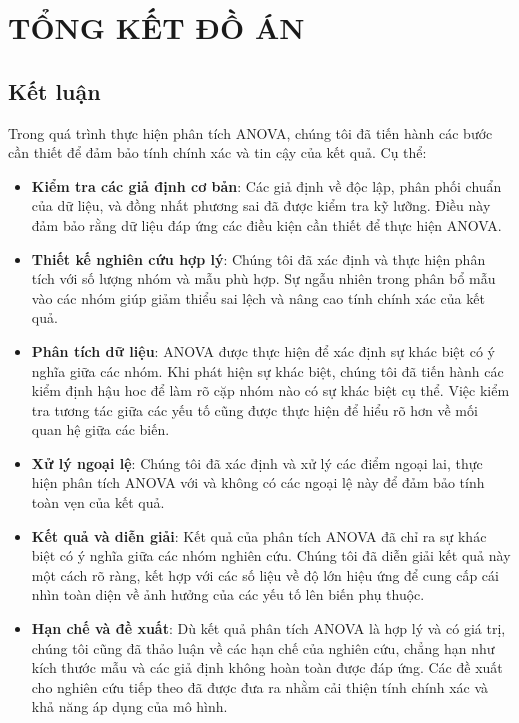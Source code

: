 \chapter{TỔNG KẾT ĐỒ ÁN}


\section{Kết luận}

Trong quá trình thực hiện phân tích ANOVA, chúng tôi đã tiến hành các bước cần thiết để đảm bảo tính chính xác và tin cậy của kết quả. Cụ thể:

\begin{itemize}
    \item \textbf{Kiểm tra các giả định cơ bản}: Các giả định về độc lập, phân phối chuẩn của dữ liệu, và đồng nhất phương sai đã được kiểm tra kỹ lưỡng. Điều này đảm bảo rằng dữ liệu đáp ứng các điều kiện cần thiết để thực hiện ANOVA.
    
    \item \textbf{Thiết kế nghiên cứu hợp lý}: Chúng tôi đã xác định và thực hiện phân tích với số lượng nhóm và mẫu phù hợp. Sự ngẫu nhiên trong phân bổ mẫu vào các nhóm giúp giảm thiểu sai lệch và nâng cao tính chính xác của kết quả.
    
    \item \textbf{Phân tích dữ liệu}: ANOVA được thực hiện để xác định sự khác biệt có ý nghĩa giữa các nhóm. Khi phát hiện sự khác biệt, chúng tôi đã tiến hành các kiểm định hậu hoc để làm rõ cặp nhóm nào có sự khác biệt cụ thể. Việc kiểm tra tương tác giữa các yếu tố cũng được thực hiện để hiểu rõ hơn về mối quan hệ giữa các biến.
    
    \item \textbf{Xử lý ngoại lệ}: Chúng tôi đã xác định và xử lý các điểm ngoại lai, thực hiện phân tích ANOVA với và không có các ngoại lệ này để đảm bảo tính toàn vẹn của kết quả.
    
    \item \textbf{Kết quả và diễn giải}: Kết quả của phân tích ANOVA đã chỉ ra sự khác biệt có ý nghĩa giữa các nhóm nghiên cứu. Chúng tôi đã diễn giải kết quả này một cách rõ ràng, kết hợp với các số liệu về độ lớn hiệu ứng để cung cấp cái nhìn toàn diện về ảnh hưởng của các yếu tố lên biến phụ thuộc.
    
    \item \textbf{Hạn chế và đề xuất}: Dù kết quả phân tích ANOVA là hợp lý và có giá trị, chúng tôi cũng đã thảo luận về các hạn chế của nghiên cứu, chẳng hạn như kích thước mẫu và các giả định không hoàn toàn được đáp ứng. Các đề xuất cho nghiên cứu tiếp theo đã được đưa ra nhằm cải thiện tính chính xác và khả năng áp dụng của mô hình.
\end{itemize}